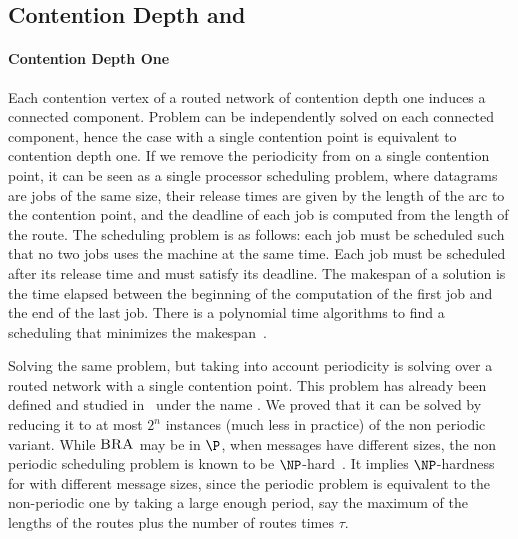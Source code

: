 \documentclass[english]{article}
\begin{document}
\subsection{Contention Depth and \spall}
\label{sec:contentiondepth}
\paragraph*{Contention Depth One}

Each contention vertex of a routed network of contention depth one induces a connected component. 
Problem \spall can be independently solved on each connected component, hence the case with a single contention point is equivalent to contention depth one. 
If we remove the periodicity from \spall on a single contention point, it can be seen as a single processor scheduling problem, where datagrams are jobs of the same size, their release times are given by the length of the arc to the contention point, and the deadline of each job is computed from the length of the route.
The scheduling problem is as follows: each job must be scheduled such that no two jobs uses the machine at the same time. Each job must be scheduled after its release time and must satisfy its deadline. The makespan of a solution is the time elapsed between the beginning of the computation of the first job and the end of the last job. There is a polynomial time algorithms to find a scheduling that minimizes the makespan~\cite{simons_fast_1978}.

Solving the same problem, but taking into account periodicity is solving \spall over 
a routed network with a single contention point. This problem has already been defined and studied in~\cite{barth2018deterministic} under the name \bra. We proved that it can be solved by reducing it to at most 
$2^n$ instances (much less in practice) of the non periodic variant. 
While $\textsc{BRA}$ may be in $\P$, when messages have different sizes, the non periodic scheduling problem is known to be $\NP$-hard~\cite{}. It implies $\NP$-hardness for \bra with different message sizes, since the periodic problem is equivalent to the non-periodic one by taking a large enough period, say the maximum of the lengths of the routes plus the number of routes times $\tau$.



     

\end{document}
